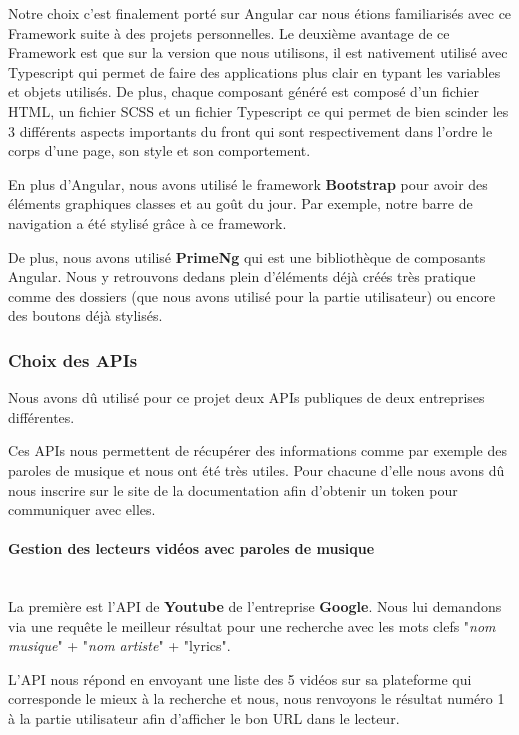 \documentclass[12pt,french]{article}
\begin{document}
Notre choix c'est finalement porté sur Angular car nous étions familiarisés avec ce Framework suite à des projets personnelles.
Le deuxième avantage de ce Framework est que sur la version que nous utilisons, il est nativement utilisé avec Typescript qui permet de faire des applications plus clair en typant les variables et objets utilisés.
De plus, chaque composant généré est composé d'un fichier HTML, un fichier SCSS et un fichier Typescript ce qui permet de bien scinder les 3 différents aspects importants du front qui sont respectivement dans l'ordre le corps d'une page, son style et son comportement.

\bigskip

En plus d'Angular, nous avons utilisé le framework \textbf{Bootstrap} pour avoir des éléments graphiques classes et au goût du jour. Par exemple, notre barre de navigation a été stylisé grâce à ce framework.

De plus, nous avons utilisé \textbf{PrimeNg} qui est une bibliothèque de composants Angular. Nous y retrouvons dedans plein d'éléments déjà créés très pratique comme des dossiers (que nous avons utilisé pour la partie utilisateur) ou encore des boutons déjà stylisés.


\subsubsection{Choix des APIs}

Nous avons dû utilisé pour ce projet deux APIs publiques de deux entreprises différentes.

\medskip

Ces APIs nous permettent de récupérer des informations comme par exemple des paroles de musique et nous ont été très utiles. Pour chacune d'elle nous avons dû nous inscrire sur le site de la documentation afin d'obtenir un token pour communiquer avec elles.

\paragraph{Gestion des lecteurs vidéos avec paroles de musique \\\\} 

La première est l'API de \textbf{Youtube} de l'entreprise \textbf{Google}. Nous lui demandons via une requête le meilleur résultat pour une recherche avec les mots clefs "\textit{nom musique}" + "\textit{nom artiste}" + "lyrics".

L'API nous répond en envoyant une liste des 5 vidéos sur sa plateforme qui corresponde le mieux à la recherche et nous, nous renvoyons le résultat numéro 1 à la partie utilisateur afin d'afficher le bon URL dans le lecteur.
\end{document}
